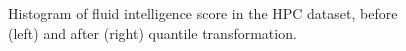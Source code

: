 \begin{figure}[H]
  \centering
  \caption{Histogram of fluid intelligence score in the HPC dataset, before (left) and after (right) quantile transformation.}
  \label{fig:hcp-hist}
\end{figure}

